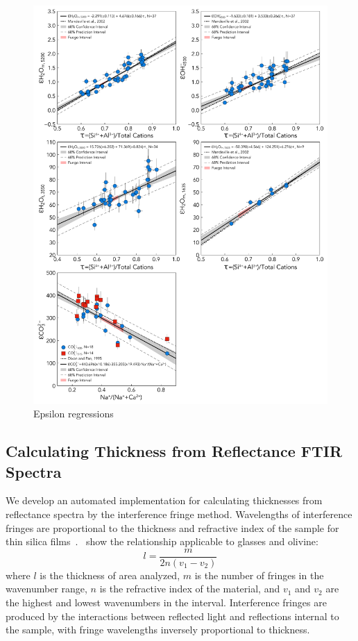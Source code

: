 \documentclass[draft]{agujournal2019}
\begin{document}
\begin{figure}[htb!] 
\centering
\includegraphics[width=1.0\textwidth]{AllEpsilonRegress}
\caption[Epsilon Regressions]{Epsilon regressions}
\label{figure:EpsilonRegressions}
\end{figure}

\subsection{Calculating Thickness from Reflectance FTIR Spectra}
We develop an automated implementation for calculating thicknesses from reflectance spectra by the interference fringe method. Wavelengths of interference fringes are proportional to the thickness and refractive index of the sample for thin silica films~\cite{Nishikidaetal1996, Tamicetal2001, WysoczanskiandTani2006, Sunetal2007}.~ show the relationship applicable to glasses and olivine: 
\begin{equation}
l = \frac{m}{2n (v_1 - v_2)}
\end{equation}
where $l$ is the thickness of area analyzed, $m$ is the number of fringes in the wavenumber range, $n$ is the refractive index of the material, and $v_1$ and $v_2$ are the highest and lowest wavenumbers in the interval. Interference fringes are produced by the interactions between reflected light and reflections internal to the sample, with fringe wavelengths inversely proportional to thickness. 
\end{document}
